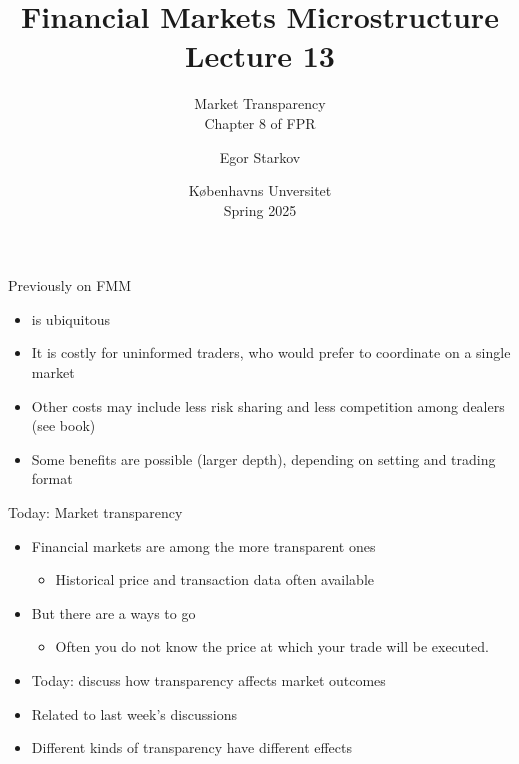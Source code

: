 \documentclass[english,10pt
,aspectratio=169
]{beamer}
\title{Financial Markets Microstructure \\ Lecture 13}
\subtitle{Market Transparency\\
	Chapter 8 of FPR}
\author{Egor Starkov}
\date{K{\o}benhavns Unversitet \\
	Spring 2025}
\begin{document}
\frame[plain]{\titlepage}


\begin{frame}{Previously on FMM}
	\begin{itemize}
		\item {} is ubiquitous 
		\item It is costly for uninformed traders, who would prefer to coordinate on a single market
		\item Other costs may include less risk sharing and less competition among dealers (see book)
		\item Some benefits are possible (larger depth), depending on setting and trading format
	\end{itemize}
\end{frame}


\begin{frame}{Today: Market transparency}
	\begin{itemize}
		\item Financial markets are among the more transparent ones
		\begin{itemize}
			\item Historical price and transaction data often available
		\end{itemize}
		\item But there are a ways to go
		\begin{itemize}
			\item Often you do not know the price at which your trade will be executed.
		\end{itemize}
		\bigskip\pause
		\item Today: discuss how transparency affects market outcomes
		\item Related to last week's discussions
		\item Different kinds of transparency have different effects
	\end{itemize}
\end{frame}
\end{document}
